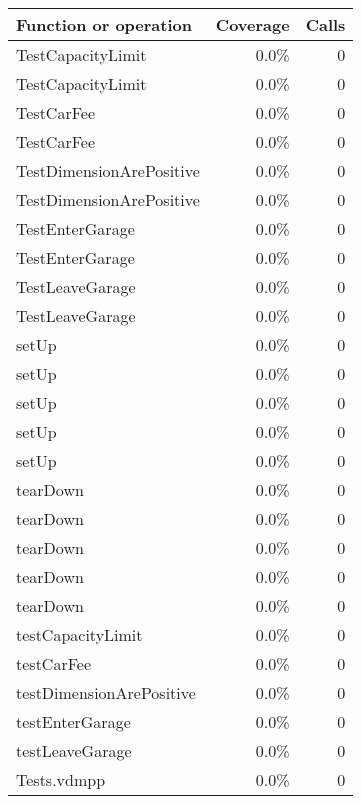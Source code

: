 \documentclass[a4paper]{article}
\begin{document}
\begin{longtable}{|l|r|r|}
\hline
Function or operation & Coverage & Calls \\
\hline
\hline
TestCapacityLimit & 0.0\% & 0 \\
\hline
TestCapacityLimit & 0.0\% & 0 \\
\hline
TestCarFee & 0.0\% & 0 \\
\hline
TestCarFee & 0.0\% & 0 \\
\hline
TestDimensionArePositive & 0.0\% & 0 \\
\hline
TestDimensionArePositive & 0.0\% & 0 \\
\hline
TestEnterGarage & 0.0\% & 0 \\
\hline
TestEnterGarage & 0.0\% & 0 \\
\hline
TestLeaveGarage & 0.0\% & 0 \\
\hline
TestLeaveGarage & 0.0\% & 0 \\
\hline
setUp & 0.0\% & 0 \\
\hline
setUp & 0.0\% & 0 \\
\hline
setUp & 0.0\% & 0 \\
\hline
setUp & 0.0\% & 0 \\
\hline
setUp & 0.0\% & 0 \\
\hline
tearDown & 0.0\% & 0 \\
\hline
tearDown & 0.0\% & 0 \\
\hline
tearDown & 0.0\% & 0 \\
\hline
tearDown & 0.0\% & 0 \\
\hline
tearDown & 0.0\% & 0 \\
\hline
testCapacityLimit & 0.0\% & 0 \\
\hline
testCarFee & 0.0\% & 0 \\
\hline
testDimensionArePositive & 0.0\% & 0 \\
\hline
testEnterGarage & 0.0\% & 0 \\
\hline
testLeaveGarage & 0.0\% & 0 \\
\hline
\hline
Tests.vdmpp & 0.0\% & 0 \\
\hline
\end{longtable}
\end{document}
